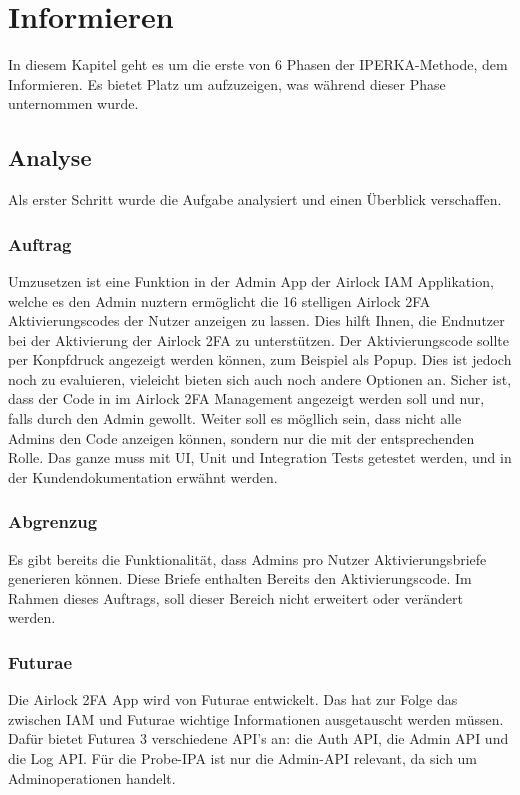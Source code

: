 \chapter{Informieren}\label{ch:informieren}

In diesem Kapitel geht es um die erste von 6 Phasen der IPERKA-Methode, dem Informieren. Es bietet Platz um aufzuzeigen, was während dieser Phase unternommen wurde.

\section{Analyse}
Als erster Schritt wurde die Aufgabe analysiert und einen Überblick verschaffen.
\subsection*{Auftrag}
Umzusetzen ist eine Funktion in der Admin App der Airlock IAM Applikation, welche es den Admin nuztern ermöglicht die 16 stelligen Airlock 2FA Aktivierungscodes der Nutzer anzeigen zu lassen. Dies hilft Ihnen, die Endnutzer bei der Aktivierung der Airlock 2FA zu unterstützen. Der Aktivierungscode sollte per Konpfdruck angezeigt werden können, zum Beispiel als Popup. Dies ist jedoch noch zu evaluieren, vieleicht bieten sich auch noch andere Optionen an. Sicher ist, dass der Code in im Airlock 2FA Management angezeigt werden soll und nur, falls durch den Admin gewollt. \newline
Weiter soll es mögllich sein, dass nicht alle Admins den Code anzeigen können, sondern nur die mit der entsprechenden Rolle. \newline
Das ganze muss mit UI, Unit und Integration Tests getestet werden, und in der Kundendokumentation erwähnt werden.

\subsection*{Abgrenzug}
Es gibt bereits die Funktionalität, dass Admins pro Nutzer Aktivierungsbriefe generieren können. Diese Briefe enthalten Bereits den Aktivierungscode. Im Rahmen dieses Auftrags, soll dieser Bereich nicht erweitert oder verändert werden.

\subsection{Futurae}
Die Airlock 2FA App wird von Futurae entwickelt. Das hat zur Folge das zwischen IAM und Futurae wichtige Informationen ausgetauscht werden müssen. Dafür bietet Futurea 3 verschiedene API's an: die Auth API, die Admin API und die Log API. Für die Probe-IPA ist nur die Admin-API relevant, da sich um Adminoperationen handelt. 

